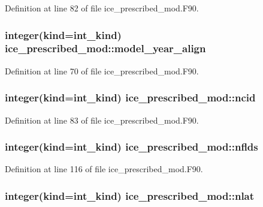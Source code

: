 Definition at line 82 of file ice\_\-prescribed\_\-mod.F90.\hypertarget{namespaceice__prescribed__mod_a1710ba150bcf274f07add3f2a05b49e7}{
\subsubsection[{model\_\-year\_\-align}]{\setlength{\rightskip}{0pt plus 5cm}integer(kind=int\_\-kind) {\bf ice\_\-prescribed\_\-mod::model\_\-year\_\-align}}}
\label{namespaceice__prescribed__mod_a1710ba150bcf274f07add3f2a05b49e7}


Definition at line 70 of file ice\_\-prescribed\_\-mod.F90.\hypertarget{namespaceice__prescribed__mod_a2f99c0b35d65529144252c26d4762bc7}{
\subsubsection[{ncid}]{\setlength{\rightskip}{0pt plus 5cm}integer(kind=int\_\-kind) {\bf ice\_\-prescribed\_\-mod::ncid}}}
\label{namespaceice__prescribed__mod_a2f99c0b35d65529144252c26d4762bc7}


Definition at line 83 of file ice\_\-prescribed\_\-mod.F90.\hypertarget{namespaceice__prescribed__mod_aeeaddf3904b52191dfe9e843ae36bcd0}{
\subsubsection[{nflds}]{\setlength{\rightskip}{0pt plus 5cm}integer(kind=int\_\-kind) {\bf ice\_\-prescribed\_\-mod::nflds}}}
\label{namespaceice__prescribed__mod_aeeaddf3904b52191dfe9e843ae36bcd0}


Definition at line 116 of file ice\_\-prescribed\_\-mod.F90.\hypertarget{namespaceice__prescribed__mod_a553da06a37ff08c4047eaf0e66d4ec53}{
\subsubsection[{nlat}]{\setlength{\rightskip}{0pt plus 5cm}integer(kind=int\_\-kind) {\bf ice\_\-prescribed\_\-mod::nlat}}}
\label{namespaceice__prescribed__mod_a553da06a37ff08c4047eaf0e66d4ec53}



